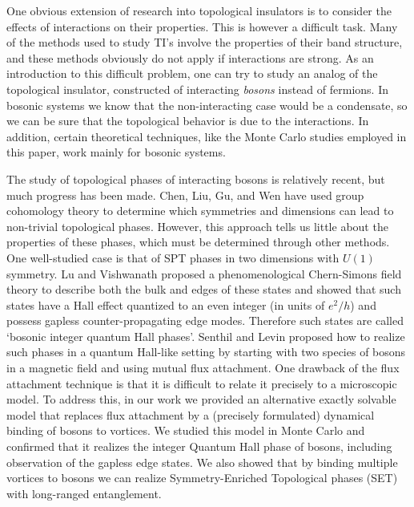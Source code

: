 \documentclass[prb,twocolumn]{revtex4-1}
\begin{document}
One obvious extension of research into topological insulators is to consider the effects of interactions on their properties. This is however a difficult task. Many of the methods used to study TI's involve the properties of their band structure, and these methods obviously do not apply if interactions are strong. As an introduction to this difficult problem, one can try to study an analog of the topological insulator, constructed of interacting {\em bosons} instead of fermions. In bosonic systems we know that the non-interacting case would be a condensate, so we can be sure that the topological behavior is due to the interactions. In addition, certain theoretical techniques, like the Monte Carlo studies employed in this paper, work mainly for bosonic systems.

The study of topological phases of interacting bosons is relatively recent, but much progress has been made. Chen, Liu, Gu, and Wen\cite{WenScience,*WenPRB} have used group cohomology theory to determine which symmetries and dimensions can lead to non-trivial topological phases. However, this approach tells us little about the properties of these phases, which must be determined through other methods. One well-studied case is that of SPT phases in two dimensions with $U(1)$ symmetry. Lu and Vishwanath\cite{LuVishwanath} proposed a phenomenological Chern-Simons field theory to describe both the bulk and edges of these states and showed that such states have a Hall effect quantized to an even integer (in units of $e^2/h$) and possess gapless counter-propagating edge modes. Therefore such states are called `bosonic integer quantum Hall phases'. Senthil and Levin\cite{SenthilLevin} proposed how to realize such phases in a quantum Hall-like setting by starting with two species of bosons in a magnetic field and using mutual flux attachment.  One drawback of the flux attachment technique is that it is difficult to relate it precisely to a microscopic model.  To address this, in our work\cite{FQHE} we provided an alternative exactly solvable model that replaces flux attachment by a (precisely formulated) dynamical binding of bosons to vortices.  We studied this model in Monte Carlo and confirmed that it realizes the integer Quantum Hall phase of bosons, including observation of the gapless edge states.  We also showed that by binding multiple vortices to bosons we can realize Symmetry-Enriched Topological phases (SET) with long-ranged entanglement.
\end{document}
